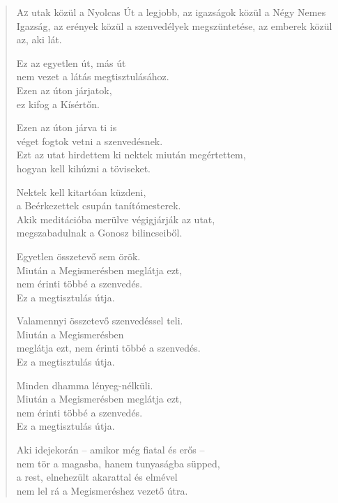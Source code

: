
\begin{verse}

{\par%
\lettrine[slope=0.5em]{A}{z} {\LettrineTextFont utak közül a Nyolcas Út a legjobb,}\newline
az igazságok közül a Négy Nemes Igazság,\newline
az erények közül a szenvedélyek megszüntetése,\verselinebreak
az emberek közül az, aki lát.
\par}

 Ez az egyetlen út, más út\\
nem vezet a látás megtisztulásához.\\
Ezen az úton járjatok,\\
ez kifog a Kísértőn.

 Ezen az úton járva ti is\\
véget fogtok vetni a szenvedésnek.\\
Ezt az utat hirdettem ki nektek miután megértettem,\\
hogyan kell kihúzni a töviseket.

 Nektek kell kitartóan küzdeni,\\
a Beérkezettek csupán tanítómesterek.\\
Akik meditációba merülve végigjárják az utat,\\
megszabadulnak a Gonosz bilincseiből.

 Egyetlen összetevő sem örök.\\
Miután a Megismerésben meglátja ezt,\\
nem érinti többé a szenvedés.\\
Ez a megtisztulás útja.

 Valamennyi összetevő szenvedéssel teli.\\
Miután a Megismerésben\\
meglátja ezt, nem érinti többé a szenvedés.\\
Ez a megtisztulás útja.

 Minden dhamma lényeg-nélküli.\\
Miután a Megismerésben meglátja ezt,\\
nem érinti többé a szenvedés.\\
Ez a megtisztulás útja.

 Aki idejekorán – amikor még fiatal és erős –\\
nem tör a magasba, hanem tunyaságba süpped,\\
a rest, elnehezült akarattal és elmével\\
nem lel rá a Megismeréshez vezető útra.


\end{verse}

